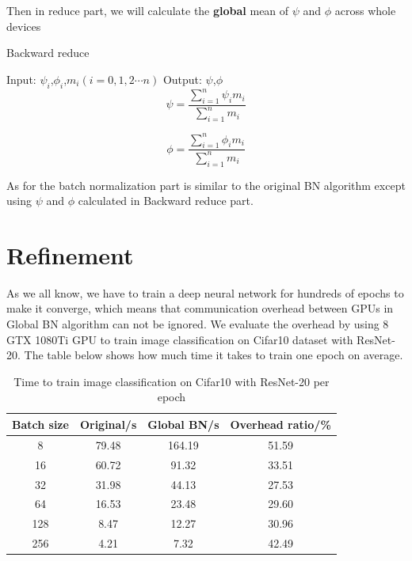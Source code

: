 Then in reduce part, we will calculate the \textbf{global} mean of $\psi$ and $\phi$ across whole devices

\begin{algorithm}
    \caption{Backward reduce}
    \label{alg:backward-reduce}
    \begin{algorithmic}[1]
        \State Input: $\psi_{i}$,$\phi_{i}$,$m_{i}$$(i = 0,1,2\cdots n)$
        \State Output: $\psi$,$\phi$
        \begin{equation}
            {\psi} = {\frac{ \sum_{i=1}^{n} {\psi_{i}} {m_{i}} }{\sum_{i=1}^{n} {m_{i}}}}
        \end{equation}

        \begin{equation}
            {\phi} = {\frac{ \sum_{i=1}^{n} {\phi_{i}} {m_{i}} }{ \sum_{i=1}^{n} {m_{i}}}}
        \end{equation}
    \end{algorithmic}
\end{algorithm}


As for the batch normalization part is similar to the original BN algorithm except using $\psi$ and $\phi$ calculated in Backward reduce part.
\section{Refinement}

As we all know, we have to train a deep neural network for hundreds of epochs to make it converge, which means that communication overhead between GPUs in Global BN algorithm can not be ignored. We evaluate the overhead by using 8 GTX 1080Ti GPU to  train image classification on Cifar10 dataset\cite{krizhevsky2014cifar} with ResNet-20. The table below shows how much time it takes to train one epoch on average.

\begin{table}[!hbp]
    
    \begin{tabular}{|c|c|c|c|}
        \hline Batch size & Original/s & Global BN/s & Overhead ratio/\% \\
        \hline    8 & 79.48  &  164.19  & 51.59 \\
        \hline    16 & 60.72  &  91.32  & 33.51 \\
        \hline    32 &  31.98   &  44.13  &  27.53 \\
        \hline    64  &  16.53   &  23.48   & 29.60 \\
        \hline    128  &  8.47  &  12.27  &  30.96 \\
        \hline    256  &  4.21  &   7.32  &   42.49 \\
        \hline
        
    \end{tabular}
    \caption{Time to train image classification on Cifar10 with ResNet-20 per epoch}
    \label{tab:overhead}
\end{table}

